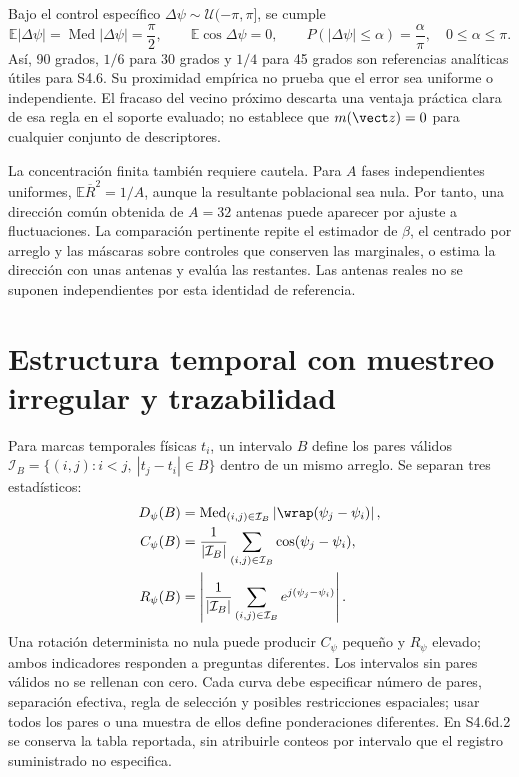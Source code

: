Bajo el control específico $\Delta\psi\sim\mathcal U(-\pi,\pi]$, se cumple
\begin{equation}
\mathbb E|\Delta\psi|=\operatorname{Med}|\Delta\psi|=\frac{\pi}{2},\qquad
\mathbb E\cos\Delta\psi=0,\qquad
P(|\Delta\psi|\leq\alpha)=\frac{\alpha}{\pi},\quad 0\leq\alpha\leq\pi.
\label{eq:uniform_phase_control}
\end{equation}
Así, 90 grados, $1/6$ para 30 grados y $1/4$ para 45 grados son referencias
analíticas útiles para S4.6. Su proximidad empírica no prueba que el error sea
uniforme o independiente. El fracaso del vecino próximo descarta una ventaja
práctica clara de esa regla en el soporte evaluado; no establece que
$m(\vect z)=0$ para cualquier conjunto de descriptores.

La concentración finita también requiere cautela. Para $A$ fases independientes
uniformes, $\mathbb E\overline R^2=1/A$, aunque la resultante poblacional sea
nula. Por tanto, una dirección común obtenida de $A=32$ antenas puede aparecer
por ajuste a fluctuaciones. La comparación pertinente repite el estimador de
$\beta$, el centrado por arreglo y las máscaras sobre controles que conserven
las marginales, o estima la dirección con unas antenas y evalúa las restantes.
Las antenas reales no se suponen independientes por esta identidad de referencia.

\section{Estructura temporal con muestreo irregular y trazabilidad}
\label{sec:temporal_circular_protocol}

Para marcas temporales físicas $t_i$, un intervalo $B$ define los pares válidos
$\mathcal I_B=\{(i,j):i<j,\ |t_j-t_i|\in B\}$ dentro de un mismo arreglo.
Se separan tres estadísticos:
\begin{align}
D_\psi(B)&=\operatorname{Med}_{(i,j)\in\mathcal I_B}
\left|\wrap(\psi_j-\psi_i)\right|,\\
C_\psi(B)&=\frac{1}{|\mathcal I_B|}\sum_{(i,j)\in\mathcal I_B}
\cos(\psi_j-\psi_i),\\
R_\psi(B)&=\left|\frac{1}{|\mathcal I_B|}\sum_{(i,j)\in\mathcal I_B}
e^{j(\psi_j-\psi_i)}\right|.
\label{eq:temporal_phase_structure}
\end{align}
Una rotación determinista no nula puede producir $C_\psi$ pequeño y $R_\psi$
elevado; ambos indicadores responden a preguntas diferentes. Los intervalos
sin pares válidos no se rellenan con cero. Cada curva debe especificar número
de pares, separación efectiva, regla de selección y posibles restricciones
espaciales; usar todos los pares o una muestra de ellos define ponderaciones
diferentes. En S4.6d.2 se conserva la tabla reportada, sin atribuirle conteos
por intervalo que el registro suministrado no especifica.

